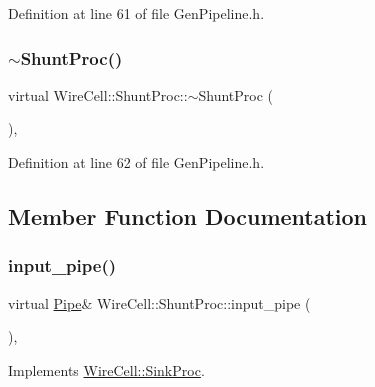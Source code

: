 Definition at line 61 of file Gen\+Pipeline.\+h.

\mbox{\label{class_wire_cell_1_1_shunt_proc_a1056010c4a1d191e09ce5b2c31e97048}} 
\subsubsection{\texorpdfstring{$\sim$\+Shunt\+Proc()}{~ShuntProc()}}
{\footnotesize\ttfamily virtual Wire\+Cell\+::\+Shunt\+Proc\+::$\sim$\+Shunt\+Proc (\begin{DoxyParamCaption}{ }\end{DoxyParamCaption})\hspace{0.3cm}{\ttfamily [inline]}, {\ttfamily [virtual]}}



Definition at line 62 of file Gen\+Pipeline.\+h.



\subsection{Member Function Documentation}
\mbox{\label{class_wire_cell_1_1_shunt_proc_a64f7a4594c007c4ffd3ea12febaffbfa}} 
\subsubsection{\texorpdfstring{input\+\_\+pipe()}{input\_pipe()}}
{\footnotesize\ttfamily virtual \hyperlink{namespace_wire_cell_afce9bb01c731347c3d4c8ca9d4ed804f}{Pipe}\& Wire\+Cell\+::\+Shunt\+Proc\+::input\+\_\+pipe (\begin{DoxyParamCaption}{ }\end{DoxyParamCaption})\hspace{0.3cm}{\ttfamily [inline]}, {\ttfamily [virtual]}}



Implements \hyperlink{class_wire_cell_1_1_sink_proc_a47ec8c790457ad63e9d0bb9b1b7da935}{Wire\+Cell\+::\+Sink\+Proc}.



